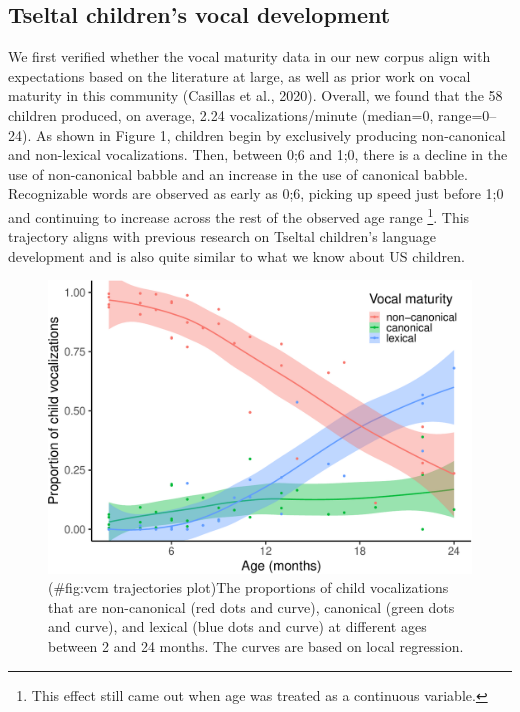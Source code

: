 \documentclass[
  man]{apa6}
\begin{document}
\hypertarget{tseltal-childrens-vocal-development}{%
\subsection{Tseltal children's vocal development}\label{tseltal-childrens-vocal-development}}

We first verified whether the vocal maturity data in our new corpus align with expectations based on the literature at large, as well as prior work on vocal maturity in this community (Casillas et al., 2020). Overall, we found that the 58 children produced, on average, 2.24 vocalizations/minute (median=0, range=0--24). As shown in Figure 1, children begin by exclusively producing non-canonical and non-lexical vocalizations. Then, between 0;6 and 1;0, there is a decline in the use of non-canonical babble and an increase in the use of canonical babble. Recognizable words are observed as early as 0;6, picking up speed just before 1;0 and continuing to increase across the rest of the observed age range \footnote{This effect still came out when age was treated as a continuous variable.}. This trajectory aligns with previous research on Tseltal children's language development and is also quite similar to what we know about US children.

\begin{figure}
\centering
\includegraphics{turntaking_paper_files/figure-latex/vcm trajectories plot-1.pdf}
\caption{(\#fig:vcm trajectories plot)The proportions of child vocalizations that are non-canonical (red dots and curve), canonical (green dots and curve), and lexical (blue dots and curve) at different ages between 2 and 24 months. The curves are based on local regression.}
\end{figure}
\end{document}
